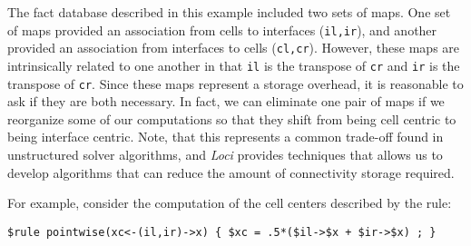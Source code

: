\documentclass[10pt,epsf]{book}
\begin{document}
The fact database described in this example included two sets of
maps.  One set of maps provided an association from cells to
interfaces ({\tt il,ir}), and another provided an association from
interfaces to cells ({\tt cl,cr}).  However, these maps are
intrinsically related to one another in that {\tt il} is the transpose
of {\tt cr} and {\tt ir} is the transpose of {\tt cr}.  Since these
maps represent a storage overhead, it is reasonable to ask if they are
both necessary.  In fact, we can eliminate one pair of maps if we
reorganize some of our computations so that they shift from being cell
centric to being interface centric.  Note, that this represents a
common trade-off found in unstructured solver algorithms, and {\it Loci}
provides techniques that allows us to develop algorithms that can
reduce the amount of connectivity storage required.  

For example, consider the computation of the cell centers described
by the rule:
\begin{verbatim}
$rule pointwise(xc<-(il,ir)->x) { $xc = .5*($il->$x + $ir->$x) ; }
\end{verbatim}
\end{document}
